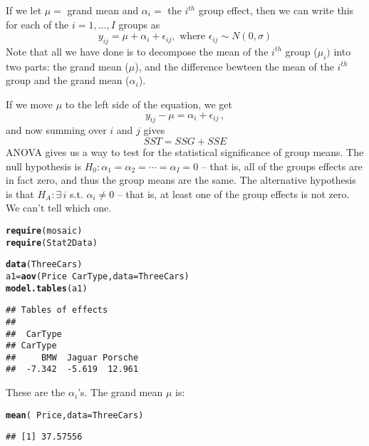 \documentclass[10pt]{article}\usepackage[]{graphicx}\usepackage[]{color}
\makeatletter
\newcommand{\hlopt}[1]{\textcolor[rgb]{0,0,0}{#1}}%
\newcommand{\hlstd}[1]{\textcolor[rgb]{0.345,0.345,0.345}{#1}}%
\newcommand{\hlkwb}[1]{\textcolor[rgb]{0.69,0.353,0.396}{#1}}%
\newcommand{\hlkwc}[1]{\textcolor[rgb]{0.333,0.667,0.333}{#1}}%
\newcommand{\hlkwd}[1]{\textcolor[rgb]{0.737,0.353,0.396}{\textbf{#1}}}%
\newenvironment{kframe}{%
 \def\at@end@of@kframe{}%
 \ifinner\ifhmode%
  \def\at@end@of@kframe{\end{minipage}}%
  \begin{minipage}{\columnwidth}%
 \fi\fi%
 \def\FrameCommand##1{\hskip\@totalleftmargin \hskip-\fboxsep
 \colorbox{shadecolor}{##1}\hskip-\fboxsep
     \hskip-\linewidth \hskip-\@totalleftmargin \hskip\columnwidth}%
 \MakeFramed {\advance\hsize-\width
   \@totalleftmargin\z@ \linewidth\hsize
   \@setminipage}}%
 {\par\unskip\endMakeFramed%
 \at@end@of@kframe}
\newenvironment{knitrout}{}{} %
\makeatother
\begin{document}
If we let $\mu = $ grand mean and $\alpha_i =$ the $i^{th}$ group effect, then we can write this for each of the $i=1,\ldots,I$ groups as
$$
    y_{ij} = \mu + \alpha_i + \epsilon_{ij}, \text{ where } \epsilon_{ij} \sim N(0, \sigma)
$$
Note that all we have done is to decompose the mean of the $i^{th}$ group ($\mu_i)$ into two parts: the grand mean ($\mu$), and the difference bewteen the mean of the $i^{th}$ group and the grand mean ($\alpha_i$). 

If we move $\mu$ to the left side of the equation, we get
$$
    y_{ij} - \mu = \alpha_i + \epsilon_{ij}\,,
$$
and now summing over $i$ and $j$ gives
$$
  		SST = SSG + SSE
$$
ANOVA gives us a way to test for the statistical significance of group means. The null hypothesis is $H_0: \alpha_1 = \alpha_2 = \cdots = \alpha_I = 0$ -- that is, all of the groups effects are in fact zero, and thus the group means are the same. The alternative hypothesis is that $H_A: \exists \,i$ s.t. $\alpha_i \neq 0$ -- that is, at least one of the group effects is not zero. We can't tell which one. 
\begin{knitrout}\footnotesize
{}\color{fgcolor}\begin{kframe}
\begin{alltt}
\hlkwd{require}\hlstd{(mosaic)}
\hlkwd{require}\hlstd{(Stat2Data)}

\hlkwd{data}\hlstd{(ThreeCars)}
\hlstd{a1} \hlkwb{=} \hlkwd{aov}\hlstd{(Price} \hlopt{~} \hlstd{CarType,} \hlkwc{data}\hlstd{=ThreeCars)}
\hlkwd{model.tables}\hlstd{(a1)}
\end{alltt}
\begin{verbatim}
## Tables of effects
## 
##  CarType 
## CarType
##     BMW  Jaguar Porsche 
##  -7.342  -5.619  12.961
\end{verbatim}
\end{kframe}
\end{knitrout}

These are the $\alpha_i$'s. The grand mean $\mu$ is:

\begin{knitrout}\footnotesize
{}\color{fgcolor}\begin{kframe}
\begin{alltt}
\hlkwd{mean}\hlstd{(}\hlopt{~}\hlstd{Price,} \hlkwc{data}\hlstd{=ThreeCars)}
\end{alltt}
\begin{verbatim}
## [1] 37.57556
\end{verbatim}
\end{kframe}
\end{knitrout}
\end{document}
